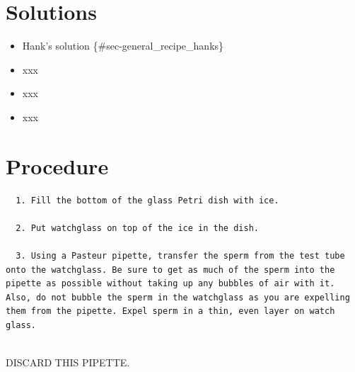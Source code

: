 \documentclass[
  letterpaper,
  DIV=11,
  numbers=noendperiod]{scrreprt}
\providecommand{\tightlist}{%
  \setlength{\itemsep}{0pt}\setlength{\parskip}{0pt}}\usepackage{longtable,booktabs,array}
\begin{document}
\hypertarget{solutions-76}{%
\section{Solutions}\label{solutions-76}}

\begin{itemize}
\tightlist
\item
  Hank's solution \{\#sec-general\_recipe\_hanks\}
\item
  xxx
\item
  xxx
\item
  xxx
\end{itemize}

\hypertarget{procedure-83}{%
\section{Procedure}\label{procedure-83}}

\begin{verbatim}
  1. Fill the bottom of the glass Petri dish with ice. 
  
  2. Put watchglass on top of the ice in the dish. 
  
  3. Using a Pasteur pipette, transfer the sperm from the test tube onto the watchglass. Be sure to get as much of the sperm into the pipette as possible without taking up any bubbles of air with it. Also, do not bubble the sperm in the watchglass as you are expelling them from the pipette. Expel sperm in a thin, even layer on watch glass.  
  
\end{verbatim}

\begin{tcolorbox}[enhanced jigsaw, rightrule=.15mm, title=\textcolor{quarto-callout-warning-color}{\faExclamationTriangle}\hspace{0.5em}{Warning}, titlerule=0mm, opacitybacktitle=0.6, toprule=.15mm, bottomrule=.15mm, opacityback=0, left=2mm, colframe=quarto-callout-warning-color-frame, breakable, coltitle=black, colback=white, colbacktitle=quarto-callout-warning-color!10!white, bottomtitle=1mm, leftrule=.75mm, toptitle=1mm, arc=.35mm]

DISCARD THIS PIPETTE.

\end{tcolorbox}
\end{document}
